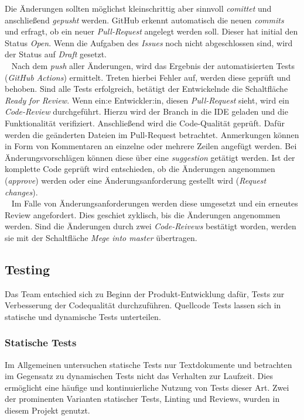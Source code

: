 \documentclass[10pt, a4paper]{article}
\begin{document}
\begin{onehalfspace}
    Die Änderungen sollten möglichst kleinschrittig aber sinnvoll \textit{comittet} und anschließend \textit{gepusht} werden.
    GitHub erkennt automatisch die neuen \textit{commits} und erfragt, ob ein neuer \textit{Pull-Request} angelegt werden soll.
    Dieser hat initial den Status \textit{Open}.
    Wenn die Aufgaben des \textit{Issues} noch nicht abgeschlossen sind, wird der Status auf \textit{Draft} gesetzt.
    \\~
    Nach dem \textit{push} aller Änderungen, wird das Ergebnis der automatisierten Tests (\textit{GitHub Actions}) ermittelt. Treten hierbei Fehler auf,
    werden diese geprüft und behoben. Sind alle Tests erfolgreich, betätigt der Entwickelnde die Schaltfläche \textit{Ready for Review}.
    Wenn ein:e Entwickler:in, diesen \textit{Pull-Request} sieht, wird ein \textit{Code-Review} durchgeführt.
    Hierzu wird der Branch in die IDE geladen und die Funktionalität verifiziert. Anschließend wird die Code-Qualität geprüft.
    Dafür werden die geänderten Dateien im Pull-Request betrachtet. Anmerkungen können in Form
    von Kommentaren an einzelne oder mehrere Zeilen angefügt werden. Bei Änderungsvorschlägen können diese über eine \textit{suggestion}
    getätigt werden. Ist der komplette Code geprüft wird entschieden,
    ob die Änderungen angenommen (\textit{approve}) werden oder eine Änderungsanforderung gestellt wird (\textit{Request changes}).
    \\~
    Im Falle von Änderungsanforderungen werden diese umgesetzt und ein erneutes Review angefordert. Dies geschiet zyklisch, bis die Änderungen angenommen werden.
    Sind die Änderungen durch zwei \textit{Code-Reivews} bestätigt worden, werden sie mit der Schaltfläche \textit{Mege into master} übertragen.

  \subsection{Testing}
  Das Team entschied sich zu Beginn der Produkt-Entwicklung dafür, Tests zur Verbesserung der Codequalität durchzuführen.
  Quellcode Tests lassen sich in statische und dynamische Tests unterteilen.

  \subsubsection*{Statische Tests}
    Im Allgemeinen untersuchen statische Tests nur Textdokumente und betrachten im Gegensatz zu dynamischen Tests nicht das Verhalten zur Laufzeit.
    Dies ermöglicht eine häufige und kontinuierliche Nutzung von Tests dieser Art.
    Zwei der prominenten Varianten statischer Tests, Linting und Reviews, wurden in diesem Projekt genutzt.


\end{onehalfspace}
\end{document}
